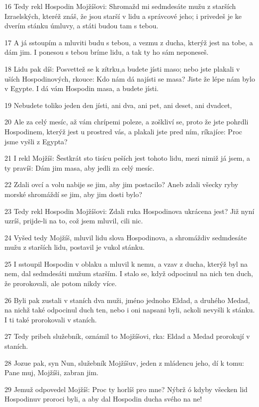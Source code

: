 \par 16 Tedy rekl Hospodin Mojžíšovi: Shromažd mi sedmdesáte mužu z starších Izraelských, kteréž znáš, že jsou starší v lidu a správcové jeho; i privedeš je ke dverím stánku úmluvy, a státi budou tam s tebou.
\par 17 A já sstoupím a mluviti budu s tebou, a vezmu z ducha, kterýž jest na tobe, a dám jim. I ponesou s tebou bríme lidu, a tak ty ho sám neponeseš.
\par 18 Lidu pak díš: Posvettež se k zítrku,a budete jísti maso; nebo jste plakali v uších Hospodinových, rkouce: Kdo nám dá najísti se masa? Jiste že lépe nám bylo v Egypte. I dá vám Hospodin masa, a budete jísti.
\par 19 Nebudete toliko jeden den jísti, ani dva, ani pet, ani deset, ani dvadcet,
\par 20 Ale za celý mesíc, až vám chrípemi poleze, a zoškliví se, proto že jste pohrdli Hospodinem, kterýž jest u prostred vás, a plakali jste pred ním, ríkajíce: Proc jsme vyšli z Egypta?
\par 21 I rekl Mojžíš: Šestkrát sto tisícu peších jest tohoto lidu, mezi nimiž já jsem, a ty pravíš: Dám jim masa, aby jedli za celý mesíc.
\par 22 Zdali ovcí a volu nabije se jim, aby jim postacilo? Aneb zdali všecky ryby morské shromáždí se jim, aby jim dosti bylo?
\par 23 Tedy rekl Hospodin Mojžíšovi: Zdali ruka Hospodinova ukrácena jest? Již nyní uzríš, prijde-li na to, což jsem mluvil, cili nic.
\par 24 Vyšed tedy Mojžíš, mluvil lidu slova Hospodinova, a shromáždiv sedmdesáte mužu z starších lidu, postavil je vukol stánku.
\par 25 I sstoupil Hospodin v oblaku a mluvil k nemu, a vzav z ducha, kterýž byl na nem, dal sedmdesáti mužum starším. I stalo se, když odpocinul na nich ten duch, že prorokovali, ale potom nikdy více.
\par 26 Byli pak zustali v staních dva muži, jméno jednoho Eldad, a druhého Medad, na nichž také odpocinul duch ten, nebo i oni napsani byli, ackoli nevyšli k stánku. I ti také prorokovali v staních.
\par 27 Tedy pribeh služebník, oznámil to Mojžíšovi, rka: Eldad a Medad prorokují v staních.
\par 28 Jozue pak, syn Nun, služebník Mojžíšuv, jeden z mládencu jeho, dí k tomu: Pane muj, Mojžíši, zabran jim.
\par 29 Jemuž odpovedel Mojžíš: Proc ty horlíš pro mne? Nýbrž ó kdyby všecken lid Hospodinuv proroci byli, a aby dal Hospodin ducha svého na ne!
